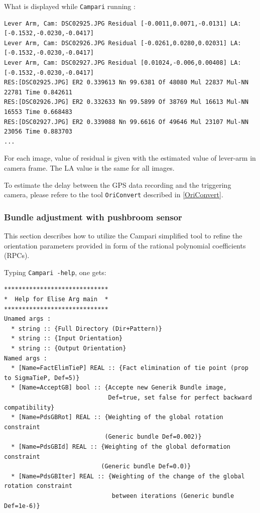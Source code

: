 \vspace{\baselineskip}
What is displayed while {\tt Campari} running :
\begin{verbatim}
Lever Arm, Cam: DSC02925.JPG Residual [-0.0011,0.0071,-0.0131] LA: [-0.1532,-0.0230,-0.0417]
Lever Arm, Cam: DSC02926.JPG Residual [-0.0261,0.0280,0.02031] LA: [-0.1532,-0.0230,-0.0417]
Lever Arm, Cam: DSC02927.JPG Residual [0.01024,-0.006,0.00408] LA: [-0.1532,-0.0230,-0.0417]
RES:[DSC02925.JPG] ER2 0.339613 Nn 99.6381 Of 48080 Mul 22837 Mul-NN 22781 Time 0.842611
RES:[DSC02926.JPG] ER2 0.332633 Nn 99.5899 Of 38769 Mul 16613 Mul-NN 16553 Time 0.668483
RES:[DSC02927.JPG] ER2 0.339088 Nn 99.6616 Of 49646 Mul 23107 Mul-NN 23056 Time 0.883703
...
\end{verbatim}

For each image, value of residual is given with the estimated value of lever-arm in camera frame. The LA value is the same
for all images.

\vspace{\baselineskip}
To estimate the delay between the GPS data recording and the triggering camera,
please refere to the tool {\tt OriConvert} described in \ref{OriConvert}.

\subsubsection{Bundle adjustment with pushbroom sensor}\label{subsub:rpcCampari}
This section describes how to utilize the Campari simplified tool to refine the orientation parameters provided in form of the rational polynomial coefficients (RPCs). 

\vspace{\baselineskip}
Typing {\tt Campari -help}, one gets:

\begin{verbatim}
*****************************
*  Help for Elise Arg main  *
*****************************
Unamed args :
  * string :: {Full Directory (Dir+Pattern)}
  * string :: {Input Orientation}
  * string :: {Output Orientation}
Named args :
  * [Name=FactElimTieP] REAL :: {Fact elimination of tie point (prop to SigmaTieP, Def=5)}
  * [Name=AcceptGB] bool :: {Accepte new Generik Bundle image, 
                             Def=true, set false for perfect backward compatibility} 
  * [Name=PdsGBRot] REAL :: {Weighting of the global rotation constraint 
                            (Generic bundle Def=0.002)}
  * [Name=PdsGBId] REAL :: {Weighting of the global deformation constraint 
                           (Generic bundle Def=0.0)} 
  * [Name=PdsGBIter] REAL :: {Weighting of the change of the global rotation constraint 
                              between iterations (Generic bundle Def=1e-6)}
\end{verbatim}

